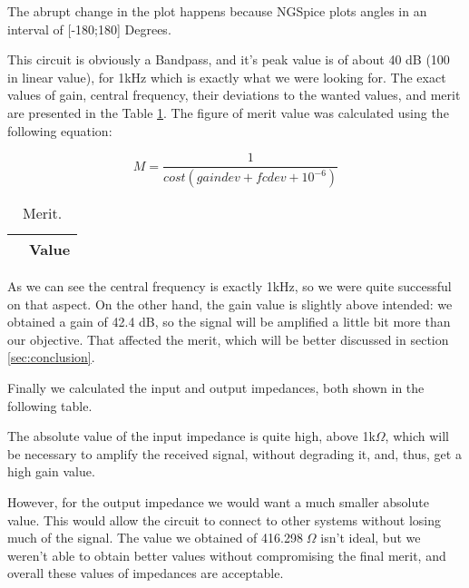  The abrupt change in the plot happens because NGSpice plots angles in an interval of [-180;180] Degrees.

This circuit is obviously a Bandpass, and it's peak value is of about 40 dB (100 in linear value), for 1kHz which is exactly what we were looking for. The exact values of gain, central frequency, their deviations to the wanted values, and merit are presented in the Table \ref{tab:ngspice7}. The figure of merit value was calculated using the following equation:

\begin{equation}
	M=\frac{1}{cost(gaindev+fcdev+10^{-6})}
\end{equation}

\FloatBarrier
\begin{table}[ht]
	\centering
	\begin{tabular}{|c|c|}
		\hline    
		& {\bf Value} \\ \hline
				
	\end{tabular}
	\caption{Merit.}
	\label{tab:ngspice7}
\end{table}
\FloatBarrier

As we can see the central frequency is exactly 1kHz, so we were quite successful on that aspect. On the other hand, the gain value is slightly above intended: we obtained a gain of 42.4 dB, so the signal will be amplified a little bit more than our objective. That affected the merit, which will be better discussed in section \ref{sec:conclusion}.
 
Finally we calculated the input and output impedances, both shown in the following table.

\FloatBarrier
\begin{table}[h]
	\centering
	\qquad
	\caption{Input and Output Impedance}
	\label{tab:sim6}
\end{table}
\FloatBarrier 

The absolute value of the input impedance is quite high, above 1k$\Omega$, which will be necessary to amplify the received signal, without degrading it, and, thus, get a high gain value.

However, for the output impedance we would want a much smaller absolute value. This would allow the circuit to connect to other systems without losing much of the signal. The value we obtained of 416.298$\;\Omega$ isn't ideal, but we weren't able to obtain better values without compromising the final merit, and overall these values of impedances are acceptable.


